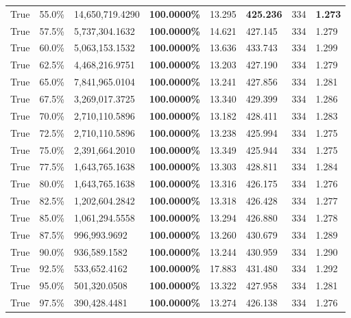 \begin{table}[H]
\begin{tabular}{lllrllll}
\cline{1-8}
True & 55.0\% & 14,650,719.4290 & \bfseries \color{red} 100.0000\% & 13.295 & \bfseries \color{red} 425.236 & 334 & \bfseries \color{red} 1.273 \\
\cline{1-8}
True & 57.5\% & 5,737,304.1632 & \bfseries \color{red} 100.0000\% & 14.621 & 427.145 & 334 & 1.279 \\
\cline{1-8}
True & 60.0\% & 5,063,153.1532 & \bfseries \color{red} 100.0000\% & 13.636 & 433.743 & 334 & 1.299 \\
\cline{1-8}
True & 62.5\% & 4,468,216.9751 & \bfseries \color{red} 100.0000\% & 13.203 & 427.190 & 334 & 1.279 \\
\cline{1-8}
True & 65.0\% & 7,841,965.0104 & \bfseries \color{red} 100.0000\% & 13.241 & 427.856 & 334 & 1.281 \\
\cline{1-8}
True & 67.5\% & 3,269,017.3725 & \bfseries \color{red} 100.0000\% & 13.340 & 429.399 & 334 & 1.286 \\
\cline{1-8}
True & 70.0\% & 2,710,110.5896 & \bfseries \color{red} 100.0000\% & 13.182 & 428.411 & 334 & 1.283 \\
\cline{1-8}
True & 72.5\% & 2,710,110.5896 & \bfseries \color{red} 100.0000\% & 13.238 & 425.994 & 334 & 1.275 \\
\cline{1-8}
True & 75.0\% & 2,391,664.2010 & \bfseries \color{red} 100.0000\% & 13.349 & 425.944 & 334 & 1.275 \\
\cline{1-8}
True & 77.5\% & 1,643,765.1638 & \bfseries \color{red} 100.0000\% & 13.303 & 428.811 & 334 & 1.284 \\
\cline{1-8}
True & 80.0\% & 1,643,765.1638 & \bfseries \color{red} 100.0000\% & 13.316 & 426.175 & 334 & 1.276 \\
\cline{1-8}
True & 82.5\% & 1,202,604.2842 & \bfseries \color{red} 100.0000\% & 13.318 & 426.428 & 334 & 1.277 \\
\cline{1-8}
True & 85.0\% & 1,061,294.5558 & \bfseries \color{red} 100.0000\% & 13.294 & 426.880 & 334 & 1.278 \\
\cline{1-8}
True & 87.5\% & 996,993.9692 & \bfseries \color{red} 100.0000\% & 13.260 & 430.679 & 334 & 1.289 \\
\cline{1-8}
True & 90.0\% & 936,589.1582 & \bfseries \color{red} 100.0000\% & 13.244 & 430.959 & 334 & 1.290 \\
\cline{1-8}
True & 92.5\% & 533,652.4162 & \bfseries \color{red} 100.0000\% & 17.883 & 431.480 & 334 & 1.292 \\
\cline{1-8}
True & 95.0\% & 501,320.0508 & \bfseries \color{red} 100.0000\% & 13.322 & 427.958 & 334 & 1.281 \\
\cline{1-8}
True & 97.5\% & 390,428.4481 & \bfseries \color{red} 100.0000\% & 13.274 & 426.138 & 334 & 1.276 \\
\cline{1-8}
\bottomrule
\end{tabular}
\end{table}
